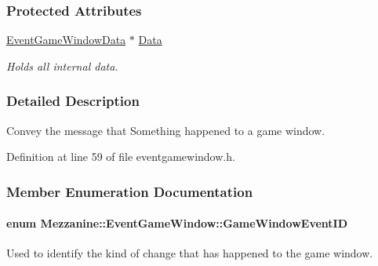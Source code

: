 \subsubsection*{Protected Attributes}
\begin{DoxyCompactItemize}
\item 
\hypertarget{classMezzanine_1_1EventGameWindow_a5db6d56993dada5f413f3564cc990ad4}{
\hyperlink{classMezzanine_1_1EventGameWindowData}{EventGameWindowData} $\ast$ \hyperlink{classMezzanine_1_1EventGameWindow_a5db6d56993dada5f413f3564cc990ad4}{Data}}
\label{classMezzanine_1_1EventGameWindow_a5db6d56993dada5f413f3564cc990ad4}

\begin{DoxyCompactList}\small\item\em Holds all internal data. \item\end{DoxyCompactList}\end{DoxyCompactItemize}


\subsubsection{Detailed Description}
Convey the message that Something happened to a game window. 

Definition at line 59 of file eventgamewindow.h.



\subsubsection{Member Enumeration Documentation}
\hypertarget{classMezzanine_1_1EventGameWindow_a0f0ff29853317334f018bcf48d502af2}{
\paragraph[{GameWindowEventID}]{\setlength{\rightskip}{0pt plus 5cm}enum {\bf Mezzanine::EventGameWindow::GameWindowEventID}}\hfill}
\label{classMezzanine_1_1EventGameWindow_a0f0ff29853317334f018bcf48d502af2}


Used to identify the kind of change that has happened to the game window. 

